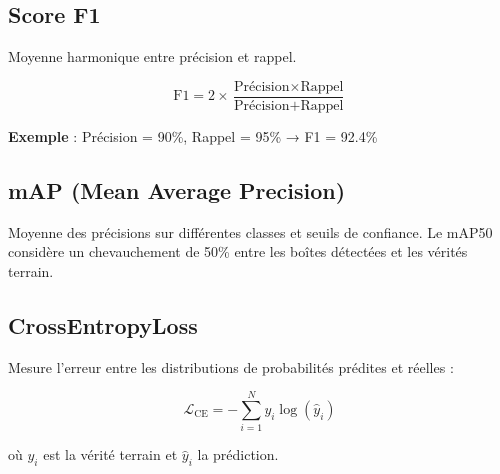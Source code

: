 \documentclass[letterpaper, 10 pt, conference]{ieeeconf}  %
\begin{document}
\subsection{Score F1}
Moyenne harmonique entre précision et rappel.

\begin{equation}
\text{F1} = 2 \times \frac{\text{Précision} \times \text{Rappel}}{\text{Précision} + \text{Rappel}}
\end{equation}

\textbf{Exemple} : Précision = 90\%, Rappel = 95\% → F1 = 92.4\%

\subsection{mAP (Mean Average Precision)}

Moyenne des précisions sur différentes classes et seuils de confiance.
Le mAP50 considère un chevauchement de 50\% entre les boîtes détectées
et les vérités terrain.

\subsection{CrossEntropyLoss}

Mesure l'erreur entre les distributions de probabilités prédites et réelles :

\begin{equation}
\mathcal{L}_{\text{CE}} = -\sum_{i=1}^{N} y_i \log(\hat{y}_i)
\end{equation}

où $y_i$ est la vérité terrain et $\hat{y}_i$ la prédiction.

\end{document}

